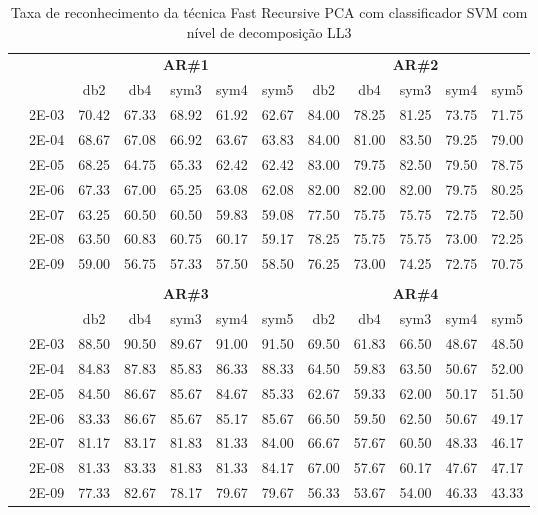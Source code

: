 \begin{table}[H]
	\centering
    \normalsize
	\caption{Taxa de reconhecimento da técnica Fast Recursive PCA com classificador SVM com nível de decomposição LL3}
	\begin{tabular}{|c|c|c c c c c|c c c c c|}
\cline{3-12}
\multicolumn{2}{c|}{\multirow{2}{*}{}} & \multicolumn{5}{c|}{\textbf{AR\#1}}  & \multicolumn{5}{c|}{\textbf{AR\#2}} \\\cline{3-12}

\multicolumn{2}{c|}{}  & db2 & db4 & sym3 & sym4 & sym5 & db2 & db4& sym3 & sym4 & sym5 \\\hline
\multicolumn{1}{|c|}{ \multirow{6}{*}{\rotatebox[origin=c]{90}{\textbf{Gamma}}} }
&2E-03&	70.42&	67.33&	68.92&	61.92&	62.67&	84.00	&78.25&	81.25&	73.75&	71.75	\\\cline{2-12}
&2E-04&	68.67&	67.08&	66.92&	63.67&	63.83&	84.00	&81.00&	83.50&	79.25&	79.00	\\\cline{2-12}
&2E-05&	68.25&	64.75&	65.33&	62.42&	62.42&	83.00	&79.75&	82.50&	79.50&	78.75	\\\cline{2-12}
&2E-06&	67.33&	67.00&	65.25&	63.08&	62.08&	82.00	&82.00&	82.00&	79.75&	80.25	\\\cline{2-12}
&2E-07&	63.25&	60.50&	60.50&	59.83&	59.08&	77.50	&75.75&	75.75&	72.75&	72.50	\\\cline{2-12}
&2E-08&	63.50&	60.83&	60.75&	60.17&	59.17&	78.25	&75.75&	75.75&	73.00&	72.25	\\\cline{2-12}
&2E-09&	59.00&	56.75&	57.33&	57.50&	58.50&	76.25	&73.00&	74.25&	72.75&	70.75	

	
	
\\ \midrule
\multicolumn{12}{c}{}\\ 

\cline{3-12}
\multicolumn{2}{c}{} & \multicolumn{5}{|c|}{\textbf{AR\#3}}  & \multicolumn{5}{c|}{\textbf{AR\#4}} \\\cline{3-12}
\multicolumn{2}{c}{}  & \multicolumn{1}{|c}{db2} & db4 & sym3 & sym4 & sym5 & db2 & db4& sym3 & sym4 & sym5 \\\hline
\multicolumn{1}{|c|}{ \multirow{6}{*}{\rotatebox[origin=c]{90}{\textbf{Gamma}}} }
&2E-03&	88.50&	90.50&	89.67&	91.00&	91.50&	69.50	&61.83&	66.50&	48.67&	48.50	\\\cline{2-12}
&2E-04&	84.83&	87.83&	85.83&	86.33&	88.33&	64.50	&59.83&	63.50&	50.67&	52.00	\\\cline{2-12}
&2E-05&	84.50&	86.67&	85.67&	84.67&	85.33&	62.67	&59.33&	62.00&	50.17&	51.50	\\\cline{2-12}
&2E-06&	83.33&	86.67&	85.67&	85.17&	85.67&	66.50	&59.50&	62.50&	50.67&	49.17	\\\cline{2-12}
&2E-07&	81.17&	83.17&	81.83&	81.33&	84.00&	66.67	&57.67&	60.50&	48.33&	46.17	\\\cline{2-12}
&2E-08&	81.33&	83.33&	81.83&	81.33&	84.17&	67.00	&57.67&	60.17&	47.67&	47.17	\\\cline{2-12}
&2E-09&	77.33&	82.67&	78.17&	79.67&	79.67&	56.33	&53.67&	54.00&	46.33&	43.33	
\\\midrule
\end{tabular}

\end{table}
